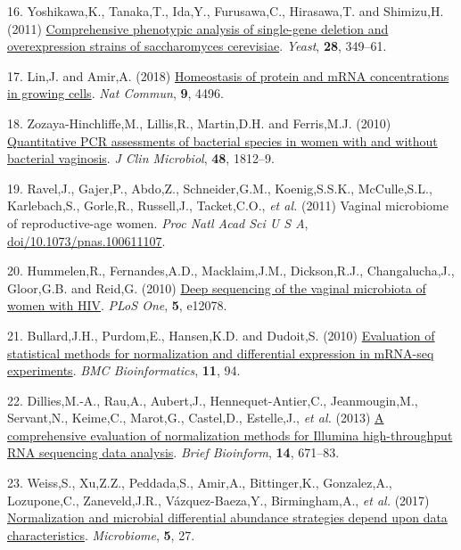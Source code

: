 \documentclass[
]{article}
\newlength{\cslhangindent}
\newenvironment{CSLReferences}[2] %
 {\begin{list}{}{%
  \setlength{\itemindent}{0pt}
  \setlength{\leftmargin}{0pt}
  \setlength{\parsep}{0pt}
  \ifodd #1
   \setlength{\leftmargin}{\cslhangindent}
   \setlength{\itemindent}{-1\cslhangindent}
  \fi
  \setlength{\itemsep}{#2\baselineskip}}}
 {\end{list}}
\begin{document}
\begin{CSLReferences}{1}{1}
16. Yoshikawa,K., Tanaka,T., Ida,Y., Furusawa,C., Hirasawa,T. and
Shimizu,H. (2011) \href{https://doi.org/10.1002/yea.1843}{Comprehensive
phenotypic analysis of single-gene deletion and overexpression strains
of saccharomyces cerevisiae}. \emph{Yeast}, \textbf{28}, 349--61.

17. Lin,J. and Amir,A. (2018)
\href{https://doi.org/10.1038/s41467-018-06714-z}{Homeostasis of protein
and mRNA concentrations in growing cells}. \emph{Nat Commun},
\textbf{9}, 4496.

18. Zozaya-Hinchliffe,M., Lillis,R., Martin,D.H. and Ferris,M.J. (2010)
\href{https://doi.org/10.1128/JCM.00851-09}{Quantitative PCR assessments
of bacterial species in women with and without bacterial vaginosis}.
\emph{J Clin Microbiol}, \textbf{48}, 1812--9.

19. Ravel,J., Gajer,P., Abdo,Z., Schneider,G.M., Koenig,S.S.K.,
McCulle,S.L., Karlebach,S., Gorle,R., Russell,J., Tacket,C.O., \emph{et
al.} (2011) Vaginal microbiome of reproductive-age women. \emph{Proc
Natl Acad Sci U S A},
\href{https://doi.org/doi/10.1073/pnas.100611107}{doi/10.1073/pnas.100611107}.

20. Hummelen,R., Fernandes,A.D., Macklaim,J.M., Dickson,R.J.,
Changalucha,J., Gloor,G.B. and Reid,G. (2010)
\href{https://doi.org/10.1371/journal.pone.0012078}{Deep sequencing of
the vaginal microbiota of women with {HIV}}. \emph{PLoS One},
\textbf{5}, e12078.

21. Bullard,J.H., Purdom,E., Hansen,K.D. and Dudoit,S. (2010)
\href{https://doi.org/10.1186/1471-2105-11-94}{Evaluation of statistical
methods for normalization and differential expression in m{RNA-seq}
experiments}. \emph{BMC Bioinformatics}, \textbf{11}, 94.

22. Dillies,M.-A., Rau,A., Aubert,J., Hennequet-Antier,C.,
Jeanmougin,M., Servant,N., Keime,C., Marot,G., Castel,D., Estelle,J.,
\emph{et al.} (2013) \href{https://doi.org/10.1093/bib/bbs046}{A
comprehensive evaluation of normalization methods for {Illumina}
high-throughput {RNA} sequencing data analysis}. \emph{Brief Bioinform},
\textbf{14}, 671--83.

23. Weiss,S., Xu,Z.Z., Peddada,S., Amir,A., Bittinger,K., Gonzalez,A.,
Lozupone,C., Zaneveld,J.R., Vázquez-Baeza,Y., Birmingham,A., \emph{et
al.} (2017)
\href{https://doi.org/10.1186/s40168-017-0237-y}{Normalization and
microbial differential abundance strategies depend upon data
characteristics}. \emph{Microbiome}, \textbf{5}, 27.


\end{CSLReferences}
\end{document}
